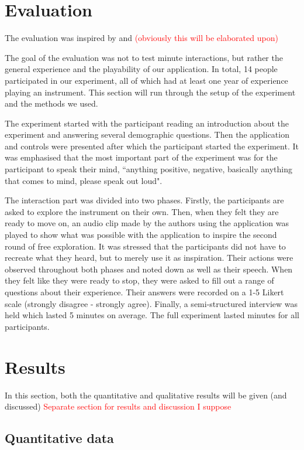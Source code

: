 \documentclass[dvipsnames, pdftex]{article}
\def\SWcomment[#1]{\textcolor{Red}{#1}}
\begin{document}
\section{Evaluation}
The evaluation was inspired by \cite{Young2003} \cite{Someren1994} \cite{Stowell2009} and \cite{Finstad2010} \SWcomment[(obviously this will be elaborated upon)]

The goal of the evaluation was not to test minute interactions, but rather the general experience and the playability of our application. In total, 14 people participated in our experiment, all of which had at least one year of experience playing an instrument. This section will run through the setup of the experiment and the methods we used.

The experiment started with the participant reading an introduction about the experiment and answering several demographic questions. Then the application and controls were presented after which the participant started the experiment. It was emphasised that the most important part of the experiment was for the participant to speak their mind, ``anything positive, negative, basically anything that comes to mind, please speak out loud".

The interaction part was divided into two phases. Firstly, the participants are asked to explore the instrument on their own. Then, when they felt they are ready to move on, an audio clip made by the authors using the application was played to show what was possible with the application to inspire the second round of free exploration. It was stressed that the participants did not have to recreate what they heard, but to merely use it as inspiration. Their actions were observed throughout both phases and noted down as well as their speech. When they felt like they were ready to stop, they were asked to fill out a range of questions about their experience. Their answers were recorded on a 1-5 Likert scale (strongly disagree - strongly agree). Finally, a semi-structured interview was held which lasted 5 minutes on average. The full experiment lasted  minutes for all participants.

\section{Results}
In this section, both the quantitative and qualitative results will be given (and discussed) \SWcomment[Separate section for results and discussion I suppose]
\subsection{Quantitative data}
\end{document}
